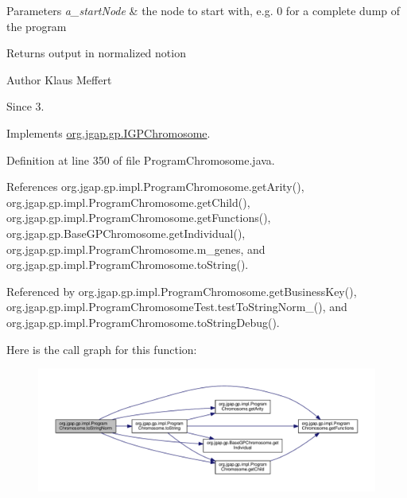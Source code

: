 \begin{DoxyParams}{Parameters}
{\em a\-\_\-start\-Node} & the node to start with, e.\-g. 0 for a complete dump of the program \\
\hline
\end{DoxyParams}
\begin{DoxyReturn}{Returns}
output in normalized notion
\end{DoxyReturn}
\begin{DoxyAuthor}{Author}
Klaus Meffert 
\end{DoxyAuthor}
\begin{DoxySince}{Since}
3. 
\end{DoxySince}


Implements \hyperlink{interfaceorg_1_1jgap_1_1gp_1_1_i_g_p_chromosome_a69a39548f0af1c9746bf6b2352f1a879}{org.\-jgap.\-gp.\-I\-G\-P\-Chromosome}.



Definition at line 350 of file Program\-Chromosome.\-java.



References org.\-jgap.\-gp.\-impl.\-Program\-Chromosome.\-get\-Arity(), org.\-jgap.\-gp.\-impl.\-Program\-Chromosome.\-get\-Child(), org.\-jgap.\-gp.\-impl.\-Program\-Chromosome.\-get\-Functions(), org.\-jgap.\-gp.\-Base\-G\-P\-Chromosome.\-get\-Individual(), org.\-jgap.\-gp.\-impl.\-Program\-Chromosome.\-m\-\_\-genes, and org.\-jgap.\-gp.\-impl.\-Program\-Chromosome.\-to\-String().



Referenced by org.\-jgap.\-gp.\-impl.\-Program\-Chromosome.\-get\-Business\-Key(), org.\-jgap.\-gp.\-impl.\-Program\-Chromosome\-Test.\-test\-To\-String\-Norm\-\_(), and org.\-jgap.\-gp.\-impl.\-Program\-Chromosome.\-to\-String\-Debug().



Here is the call graph for this function\-:
\nopagebreak
\begin{figure}[H]
\begin{center}
\leavevmode
\includegraphics[width=350pt]{classorg_1_1jgap_1_1gp_1_1impl_1_1_program_chromosome_a56c22c94166729d37888a6daaef76bb3_cgraph}
\end{center}
\end{figure}




